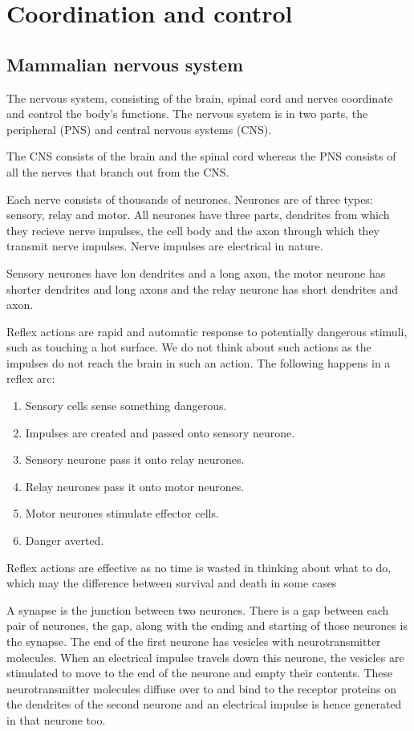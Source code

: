 \section{Coordination and control}
\subsection{Mammalian nervous system}

The nervous system, consisting of the brain, spinal cord and nerves coordinate and control the 
body's functions. The nervous system is in two parts, the peripheral (PNS) and central nervous
systems (CNS).

The CNS consists of the brain and the spinal cord whereas the PNS consists of all the nerves that
branch out from the CNS.

Each nerve consists of thousands of neurones. Neurones are of three types: sensory, relay and
motor. All neurones have three parts, dendrites from which they recieve nerve impulses, the cell
body and the axon through which they transmit nerve impulses. Nerve impulses are electrical in
nature.

Sensory neurones have lon dendrites and a long axon, the motor neurone has shorter dendrites and
long axons and the relay neurone has short dendrites and axon.

Reflex actions are rapid and automatic response to potentially dangerous stimuli, such as touching
a hot surface. We do not think about such actions as the impulses do not reach the brain in such
an action. The following happens in a reflex arc:
\begin{enumerate}
	\item Sensory cells sense something dangerous.
	\item Impulses are created and passed onto sensory neurone.
	\item Sensory neurone pass it onto relay neurones.
	\item Relay neurones pass it onto motor neurones.
	\item Motor neurones stimulate effector cells.
	\item Danger averted.
\end{enumerate}
Reflex actions are effective as no time is wasted in thinking about what to do, which may the 
difference between survival and death in some cases

A synapse is the junction between two neurones. There is a gap between each pair of neurones, the
gap, along with the ending and starting of those neurones is the synapse. The end of the first 
neurone has vesicles with neurotransmitter molecules. When an electrical impulse travels down
this neurone, the vesicles are stimulated to move to the end of the neurone and empty their 
contents. These neurotransmitter molecules diffuse over to and bind to the receptor proteins on 
the dendrites of the
second neurone and an electrical impulse is hence generated in that neurone too.

